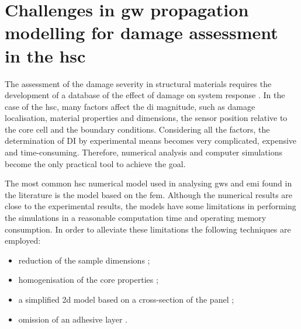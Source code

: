 \section{Challenges in \acs{gw} propagation modelling for damage assessment in the \acs{hsc}}
\label{sec:challenges}

The assessment of the damage severity in structural materials requires the development of a database of the effect of damage on system response \cite{worden2007fundamental}.
In the case of the \ac{hsc}, many factors affect the \ac{di} magnitude, such as damage localisation, material properties and dimensions, the sensor position relative to the core cell and the boundary conditions.
Considering all the factors, the determination of DI by experimental means becomes very complicated, expensive and time-consuming.
Therefore, numerical analysis and computer simulations become the only practical tool to achieve the goal.

The most common \ac{hsc} numerical model used in analysing \acp{gw} and \ac{emi} found in the literature is the model based on the \ac{fem}.
Although the numerical results are close to the experimental results, the models have some limitations in performing the simulations in a reasonable computation time and operating memory consumption.
In order to alleviate these limitations the following techniques are employed:
\begin{itemize}
\item reduction of the sample dimensions \cite{hosseini2013numerical, tian2015wavenumber};
\item homogenisation of the core properties \cite{catapano2014multi, zhou2020debonding};
\item a simplified \ac{2d} model based on a cross-section of the panel \cite{li2019detection};
\item omission of an adhesive layer \cite{mustapha2013non}.
\end{itemize}

